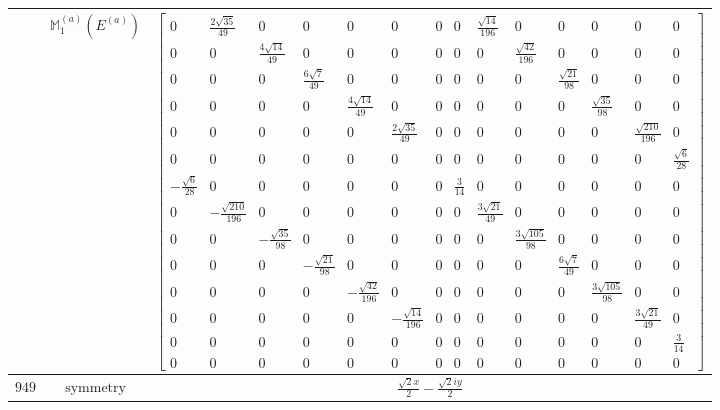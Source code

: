 \documentclass[fleqn,8pt,landscape]{jsarticle}
\begin{document}
\begin{longtable}{ccc}
$  $ & $ \mathbb{M}_{1}^{(a)}(E^{(a)}) $ & $ \begin{bmatrix} 0 & \frac{2 \sqrt{35}}{49} & 0 & 0 & 0 & 0 & 0 & 0 & \frac{\sqrt{14}}{196} & 0 & 0 & 0 & 0 & 0 \\ 0 & 0 & \frac{4 \sqrt{14}}{49} & 0 & 0 & 0 & 0 & 0 & 0 & \frac{\sqrt{42}}{196} & 0 & 0 & 0 & 0 \\ 0 & 0 & 0 & \frac{6 \sqrt{7}}{49} & 0 & 0 & 0 & 0 & 0 & 0 & \frac{\sqrt{21}}{98} & 0 & 0 & 0 \\ 0 & 0 & 0 & 0 & \frac{4 \sqrt{14}}{49} & 0 & 0 & 0 & 0 & 0 & 0 & \frac{\sqrt{35}}{98} & 0 & 0 \\ 0 & 0 & 0 & 0 & 0 & \frac{2 \sqrt{35}}{49} & 0 & 0 & 0 & 0 & 0 & 0 & \frac{\sqrt{210}}{196} & 0 \\ 0 & 0 & 0 & 0 & 0 & 0 & 0 & 0 & 0 & 0 & 0 & 0 & 0 & \frac{\sqrt{6}}{28} \\ - \frac{\sqrt{6}}{28} & 0 & 0 & 0 & 0 & 0 & 0 & \frac{3}{14} & 0 & 0 & 0 & 0 & 0 & 0 \\ 0 & - \frac{\sqrt{210}}{196} & 0 & 0 & 0 & 0 & 0 & 0 & \frac{3 \sqrt{21}}{49} & 0 & 0 & 0 & 0 & 0 \\ 0 & 0 & - \frac{\sqrt{35}}{98} & 0 & 0 & 0 & 0 & 0 & 0 & \frac{3 \sqrt{105}}{98} & 0 & 0 & 0 & 0 \\ 0 & 0 & 0 & - \frac{\sqrt{21}}{98} & 0 & 0 & 0 & 0 & 0 & 0 & \frac{6 \sqrt{7}}{49} & 0 & 0 & 0 \\ 0 & 0 & 0 & 0 & - \frac{\sqrt{42}}{196} & 0 & 0 & 0 & 0 & 0 & 0 & \frac{3 \sqrt{105}}{98} & 0 & 0 \\ 0 & 0 & 0 & 0 & 0 & - \frac{\sqrt{14}}{196} & 0 & 0 & 0 & 0 & 0 & 0 & \frac{3 \sqrt{21}}{49} & 0 \\ 0 & 0 & 0 & 0 & 0 & 0 & 0 & 0 & 0 & 0 & 0 & 0 & 0 & \frac{3}{14} \\ 0 & 0 & 0 & 0 & 0 & 0 & 0 & 0 & 0 & 0 & 0 & 0 & 0 & 0 \end{bmatrix} $ \\ \hline
$ 949 $ & $ \text{symmetry} $ & $ \frac{\sqrt{2} x}{2} - \frac{\sqrt{2} i y}{2} $ \\

\end{longtable}
\end{document}
